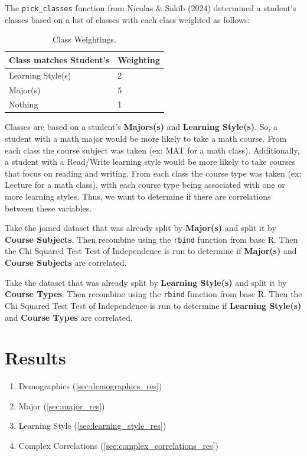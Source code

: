\documentclass{article}
\providecommand{\tightlist}{%
  \setlength{\itemsep}{0pt}\setlength{\parskip}{0pt}}
\begin{document}
\label{sec:complex_correlations}

The \texttt{pick\_classes} function from Nicolas \& Sakib (2024) determined a student's classes based on a list of classes with each class weighted as follows:

\begin{table}[htbp]
  \centering
  \begin{tabular}{|l|l|}
    \hline
    \textbf{Class matches Student's} & \textbf{Weighting} \\ \hline
    Learning Style(s) & 2 \\ \hline
    Major(s) & 5 \\ \hline
    Nothing & 1 \\ \hline
  \end{tabular}
  \caption{Class Weightings.}
  \label{tab:class_weightings}
\end{table}

Classes are based on a student's \textbf{Majors(s)} and \textbf{Learning Style(s)}. So, a student with a math major would be more likely to take a math course. From each class the course subject was taken (ex: MAT for a math class). Additionally, a student with a Read/Write learning style would be more likely to take courses that focus on reading and writing. From each class the course type was taken (ex: Lecture for a math class), with each course type being associated with one or more learning styles. Thus, we want to determine if there are correlations between these variables.

Take the joined dataset that was already split by \textbf{Major(s)} and split it by \textbf{Course Subjects}. Then recombine using the \texttt{rbind} function from base R. Then the Chi Squared Test Test of Independence is run to determine if \textbf{Major(s)} and \textbf{Course Subjects} are correlated.

Take the dataset that was already split by \textbf{Learning Style(s)} and split it by \textbf{Course Types}. Then recombine using the \texttt{rbind} function from base R. Then the Chi Squared Test Test of Independence is run to determine if \textbf{Learning Style(s)} and \textbf{Course Types} are correlated.

\section{Results}\label{results}

\begin{enumerate}
\def\labelenumi{\arabic{enumi}.}
\tightlist
\item
  Demographics (\ref{sec:demographics_res})
\item
  Major (\ref{sec:major_res})
\item
  Learning Style (\ref{sec:learning_style_res})
\item
  Complex Correlations (\ref{sec:complex_correlations_res})
\end{enumerate}
\end{document}
